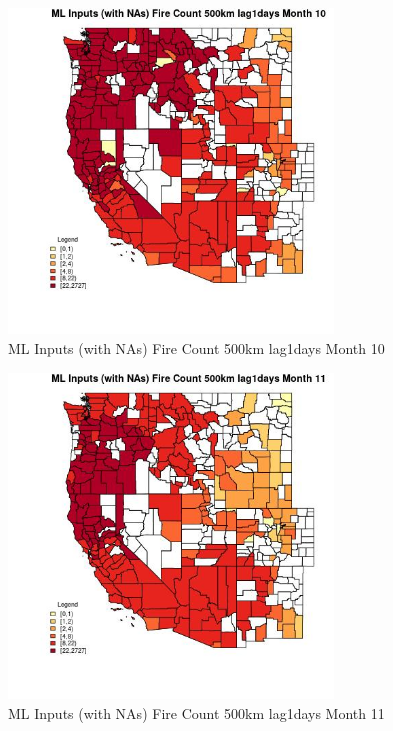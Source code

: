 \begin{figure} 
\centering  
\includegraphics[width=0.77\textwidth]{Code_Outputs/Report_ML_input_PM25_Step4_part_f_de_duplicated_aves_prioritize_24hr_obswNAs_CountyFire_Count_500km_lag1daysmedianMonth10.jpg} 
\caption{\label{fig:Report_ML_input_PM25_Step4_part_f_de_duplicated_aves_prioritize_24hr_obswNAsCountyFire_Count_500km_lag1daysmedianMonth10}ML Inputs (with NAs) Fire Count 500km lag1days Month 10} 
\end{figure} 
 

\begin{figure} 
\centering  
\includegraphics[width=0.77\textwidth]{Code_Outputs/Report_ML_input_PM25_Step4_part_f_de_duplicated_aves_prioritize_24hr_obswNAs_CountyFire_Count_500km_lag1daysmedianMonth11.jpg} 
\caption{\label{fig:Report_ML_input_PM25_Step4_part_f_de_duplicated_aves_prioritize_24hr_obswNAsCountyFire_Count_500km_lag1daysmedianMonth11}ML Inputs (with NAs) Fire Count 500km lag1days Month 11} 
\end{figure} 
 

